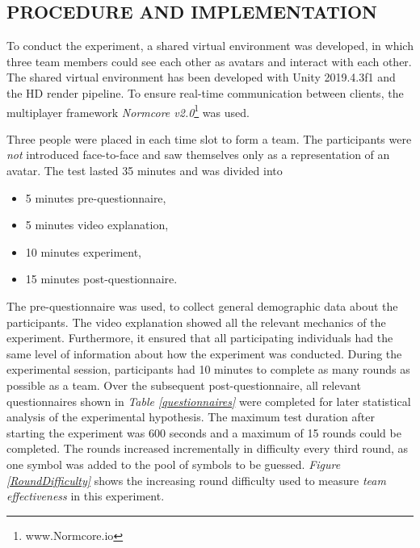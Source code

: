 \documentclass[sigchi]{acmart}
\begin{document}
\subsection{PROCEDURE AND IMPLEMENTATION}
To conduct the experiment, a shared virtual environment was developed, in which three team members could see each other as avatars and interact with each other. The shared virtual environment has been developed with Unity 2019.4.3f1 and the HD render pipeline. To ensure real-time communication between clients, the multiplayer framework \textit{Normcore v2.0}\footnote{www.Normcore.io} was used.

Three people were placed in each time slot to form a team. The participants were \textit{not} introduced face-to-face and saw themselves only as a representation of an avatar.
The test lasted 35 minutes and was divided into
		\begin{itemize}
			\item 5 minutes pre-questionnaire,
			\item 5 minutes video explanation,
			\item 10 minutes experiment,
			\item 15 minutes post-questionnaire.
		\end{itemize}
The pre-questionnaire was used, to collect general demographic data about the participants. The video explanation showed all the relevant mechanics of the experiment. Furthermore, it ensured that all participating individuals had the same level of information about how the experiment was conducted. During the experimental session, participants had 10 minutes to complete as many rounds as possible as a team. Over the subsequent post-questionnaire, all relevant questionnaires shown in \textit{Table \ref{questionnaires}} were completed for later statistical analysis of the experimental hypothesis. The maximum test duration after starting the experiment was 600 seconds and a maximum of 15 rounds could be completed. The rounds increased incrementally in difficulty every third round, as one symbol was added to the pool of symbols to be guessed.
\textit{Figure \ref{RoundDifficulty}} shows the increasing round difficulty used to measure \textit{team effectiveness} in this experiment.
\end{document}
